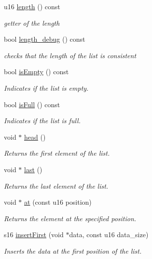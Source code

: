 \begin{DoxyCompactItemize}
u16 \hyperlink{class_list_a566b2ab22a13de70321ee2cbb237e17f}{length} () const
\begin{DoxyCompactList}\small\item\em getter of the length \end{DoxyCompactList}\item 
bool \hyperlink{class_list_a400fa1189445b0b554d56e5c3f40332e}{length\+\_\+debug} () const
\begin{DoxyCompactList}\small\item\em checks that the length of the list is consistent \end{DoxyCompactList}\item 
bool \hyperlink{class_list_a9009217d5542f230dc7276d4c954534e}{is\+Empty} () const
\begin{DoxyCompactList}\small\item\em Indicates if the list is empty. \end{DoxyCompactList}\item 
bool \hyperlink{class_list_a4b912e9b1947dac3dfeb72623206b24e}{is\+Full} () const
\begin{DoxyCompactList}\small\item\em Indicates if the list is full. \end{DoxyCompactList}\item 
void $\ast$ \hyperlink{class_list_a45822c272703eb83f6a9519c1515a736}{head} ()
\begin{DoxyCompactList}\small\item\em Returns the first element of the list. \end{DoxyCompactList}\item 
void $\ast$ \hyperlink{class_list_ae9f050eea6ba25f96ebe89e7abf820c7}{last} ()
\begin{DoxyCompactList}\small\item\em Returns the last element of the list. \end{DoxyCompactList}\item 
void $\ast$ \hyperlink{class_list_a4802fdf61227c5740868c968dcc7f7b5}{at} (const u16 position)
\begin{DoxyCompactList}\small\item\em Returns the element at the specified position. \end{DoxyCompactList}\item 
s16 \hyperlink{class_list_a68e28565a7654b6eead1d63ece94200e}{insert\+First} (void $\ast$data, const u16 data\+\_\+size)
\begin{DoxyCompactList}\small\item\em Inserts the data at the first position of the list. \end{DoxyCompactList}\item 

\end{DoxyCompactItemize}
